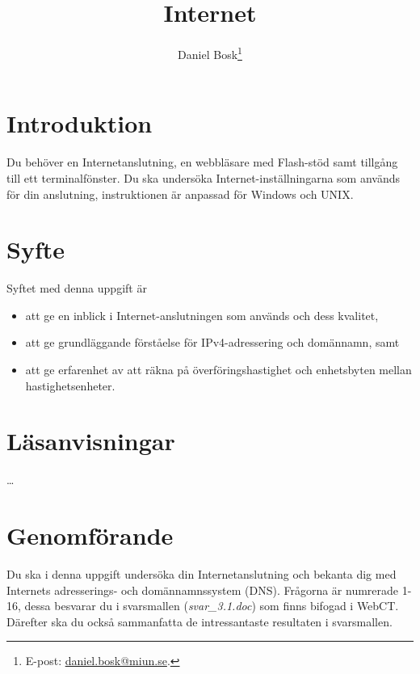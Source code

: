 \documentclass[11pt,a4paper]{miunasgn}
\title{Internet}
\author{Daniel Bosk\footnote{%
	E-post: \href{mailto:daniel.bosk@miun.se}{daniel.bosk@miun.se}.
}}
\date{\svnId}
\begin{document}
\maketitle
\thispagestyle{foot}
\tableofcontents


\section{Introduktion}
\label{sec:Introduktion}
\noindent
Du behöver en Internetanslutning, en webbläsare med Flash-stöd samt tillgång
till ett terminalfönster.
Du ska undersöka Internet-inställningarna som används för din anslutning,
instruktionen är anpassad för Windows och UNIX.


\section{Syfte}
\label{sec:Syfte}
\noindent
Syftet med denna uppgift är
\begin{itemize}
    \item att ge en inblick i Internet-anslutningen som används och dess
		kvalitet,
    \item att ge grundläggande förståelse för IPv4-adressering och domännamn,
		samt
	\item att ge erfarenhet av att räkna på överföringshastighet och
		enhetsbyten mellan hastighetsenheter.
\end{itemize}


\section{Läsanvisningar}
\label{sec:Lasanvisningar}
\noindent
\dots


\section{Genomförande}
\label{sec:Genomforande}
\noindent
Du ska i denna uppgift undersöka din Internetanslutning och bekanta dig med
Internets adresserings- och domännamnssystem (DNS).
Frågorna är numrerade 1-16, dessa besvarar du i svarsmallen
(\emph{svar\_3.1.doc}) som finns bifogad i WebCT.
Därefter ska du också sammanfatta de intressantaste resultaten i svarsmallen.
\end{document}
